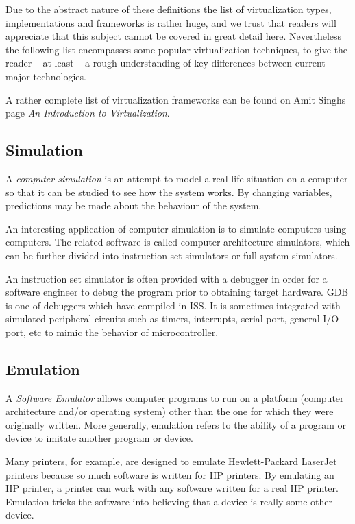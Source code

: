 Due to the abstract nature of these definitions the list of virtualization
types, implementations and frameworks is rather huge, and we trust that readers
will appreciate that this subject cannot be covered in great detail here.
Nevertheless the following list encompasses some popular virtualization
techniques, to give the reader -- at least -- a rough understanding of key
differences between current major technologies.

A rather complete list of virtualization frameworks can be found on Amit Singhs
page \textit{An Introduction to Virtualization}.~\cite{singh-intro}


\subsection{Simulation}

A \textit{computer simulation} is an attempt to model a real-life situation on
a computer so that it can be studied to see how the system works. By changing
variables, predictions may be made about the behaviour of the system.

An interesting application of computer simulation is to simulate computers
using computers. The related software is called computer architecture
simulators, which can be further divided into instruction set simulators or
full system simulators.

An instruction set simulator is often provided with a debugger in order for a
software engineer to debug the program prior to obtaining target hardware.  GDB
is one of debuggers which have compiled-in ISS. It is sometimes integrated with
simulated peripheral circuits such as timers, interrupts, serial port, general
I/O port, etc to mimic the behavior of microcontroller.~\cite{wp-iss}


\subsection{Emulation}

A \textit{Software Emulator} allows computer programs to run on a platform
(computer architecture and/or operating system) other than the one for which
they were originally written. More generally, emulation refers to the ability
of a program or device to imitate another program or device.

Many printers, for example, are designed to emulate Hewlett-Packard LaserJet
printers because so much software is written for HP printers. By emulating an
HP printer, a printer can work with any software written for a real HP printer.
Emulation tricks the software into believing that a device is really some other
device.

